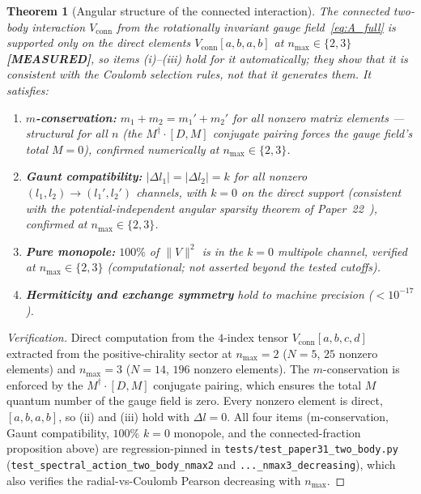 \documentclass[twocolumn,pra,amsmath,amssymb,superscriptaddress]{revtex4-2}
\newtheorem{theorem}{Theorem}
\begin{document}
\begin{theorem}[Angular structure of the connected interaction]
\label{thm:angular_structure}
The connected two-body interaction $V_{\mathrm{conn}}$ from the
rotationally invariant gauge field~\eqref{eq:A_full} is supported only
on the direct elements $V_{\mathrm{conn}}[a, b, a, b]$ at $n_{\max} \in
\{2, 3\}$ \textbf{[MEASURED]}, so items (i)--(iii) hold for it
automatically; they show that it is consistent with the Coulomb
selection rules, not that it generates them. It satisfies:
\begin{enumerate}
\item[(i)] \textbf{$m$-conservation:} $m_1 + m_2 = m_1' + m_2'$ for
  all nonzero matrix elements --- structural for all $n$ (the
  $M^\dagger \cdot [D, M]$ conjugate pairing forces the gauge field's
  total $M = 0$), confirmed numerically at $n_{\max} \in \{2, 3\}$.
\item[(ii)] \textbf{Gaunt compatibility:} $|\Delta l_1| = |\Delta
  l_2| = k$ for all nonzero $(l_1, l_2) \to (l_1', l_2')$ channels,
  with $k = 0$ on the direct support (consistent with the
  potential-independent angular sparsity theorem of
  Paper~22~\cite{paper22}), confirmed at $n_{\max} \in \{2, 3\}$.
\item[(iii)] \textbf{Pure monopole:} $100\%$ of $\|V\|^2$ is in the
  $k = 0$ multipole channel, \emph{verified at $n_{\max} \in \{2, 3\}$}
  (computational; not asserted beyond the tested cutoffs).
\item[(iv)] \textbf{Hermiticity and exchange symmetry} hold to
  machine precision ($< 10^{-17}$).
\end{enumerate}
\end{theorem}

\begin{proof}[Verification]
Direct computation from the $4$-index tensor $V_{\mathrm{conn}}[a, b,
c, d]$ extracted from the positive-chirality sector at $n_{\max} = 2$
($N = 5$, $25$ nonzero elements) and $n_{\max} = 3$ ($N = 14$, $196$
nonzero elements). The $m$-conservation is enforced by the $M^\dagger
\cdot [D, M]$ conjugate pairing, which ensures the total $M$ quantum
number of the gauge field is zero. Every nonzero element is direct,
$[a, b, a, b]$, so (ii) and (iii) hold with $\Delta l = 0$. All four
items (m-conservation, Gaunt compatibility, $100\%$ $k=0$ monopole, and
the connected-fraction proposition above) are regression-pinned in
\texttt{tests/test\_paper31\_two\_body.py} (\texttt{test\_spectral\_action\_two\_body\_nmax2}
and \texttt{...\_nmax3\_decreasing}), which also verifies the
radial-vs-Coulomb Pearson decreasing with $n_{\max}$.
\end{proof}
\end{document}
